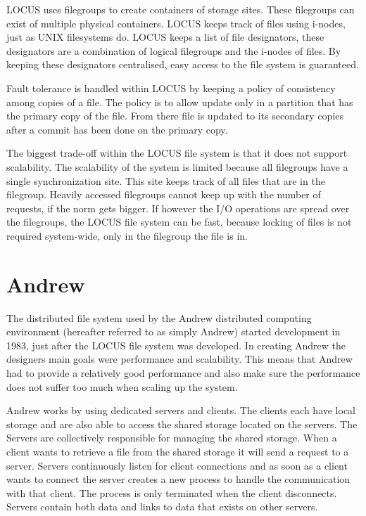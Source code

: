 \documentclass[a4paper,12px]{article}
\begin{document}
LOCUS uses filegroups to create containers of storage sites. These filegroups
can exist of multiple physical containers. LOCUS keeps track of files using
i-nodes, just as UNIX filesystems do. LOCUS keeps a list of file designators,
these designators are a combination of logical filegroups and the i-nodes of
files. By keeping these designators centralised, easy access to the file system
is guaranteed.

Fault tolerance is handled within LOCUS by keeping a policy of consistency among
copies of a file. The policy is to allow update only in a partition that has the
primary copy of the file. From there file is updated to its secondary copies
after a commit has been done on the primary copy.

The biggest trade-off within the LOCUS file system is that it does not support
scalability. The scalability of the system is limited because all filegroups
have a single synchronization site. This site keeps track of all files that are
in the filegroup. Heavily accessed filegroups cannot keep up with the number of
requests, if the norm gets bigger. If however the I/O operations are spread over
the filegroups, the LOCUS file system can be fast, because locking of files is
not required system-wide, only in the filegroup the file is in.


\section{Andrew}

The distributed file system used by the Andrew distributed computing environment
(hereafter referred to as simply Andrew) started development in 1983, just after
the LOCUS file system was developed. In creating Andrew the designers main goals
were performance and scalability. This means that Andrew had to provide a
relatively good performance and also make sure the performance does not suffer
too much when scaling up the system.\cite{andrew}

Andrew works by using dedicated servers and clients. The clients each have local
storage and are also able to access the shared storage located on the servers.
The Servers are collectively responsible for managing the shared
storage.\cite{concepts} When a client wants to retrieve a file from the shared
storage it will send a request to a server. Servers continuously listen for
client connections and as soon as a client wants to connect the server creates a
new process to handle the communication with that client. The process is only
terminated when the client disconnects.\cite{andrew} Servers contain both data
and links to data that exists on other servers.
\end{document}
